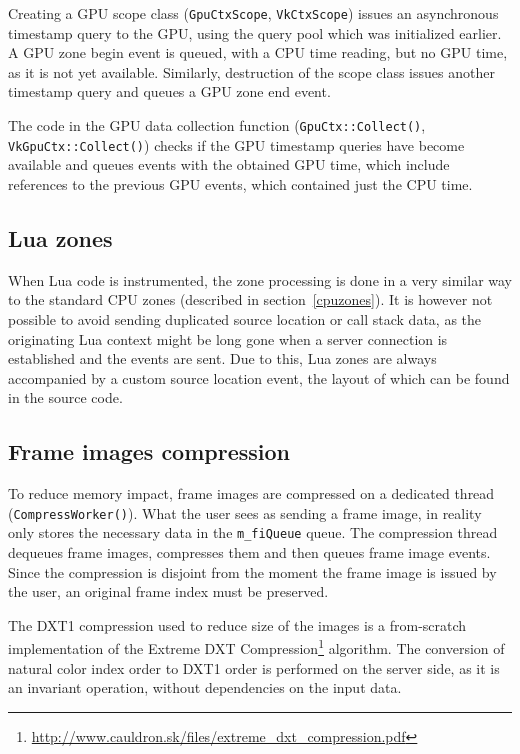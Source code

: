 \documentclass[hidelinks,titlepage,a4paper]{article}
\begin{document}
Creating a GPU scope class (\texttt{GpuCtxScope}, \texttt{VkCtxScope}) issues an asynchronous timestamp query to the GPU, using the query pool which was initialized earlier. A GPU zone begin event is queued, with a CPU time reading, but no GPU time, as it is not yet available. Similarly, destruction of the scope class issues another timestamp query and queues a GPU zone end event.

The code in the GPU data collection function (\texttt{GpuCtx::Collect()}, \texttt{VkGpuCtx::Collect()}) checks if the GPU timestamp queries have become available and queues events with the obtained GPU time, which include references to the previous GPU events, which contained just the CPU time.

\subsection{Lua zones}

When Lua code is instrumented, the zone processing is done in a very similar way to the standard CPU zones (described in section~\ref{cpuzones}). It is however not possible to avoid sending duplicated source location or call stack data, as the originating Lua context might be long gone when a server connection is established and the events are sent. Due to this, Lua zones are always accompanied by a custom source location event, the layout of which can be found in the source code.

\subsection{Frame images compression}
\label{fithread}

To reduce memory impact, frame images are compressed on a dedicated thread (\texttt{CompressWorker()}). What the user sees as sending a frame image, in reality only stores the necessary data in the \texttt{m\_fiQueue} queue. The compression thread dequeues frame images, compresses them and then queues frame image events. Since the compression is disjoint from the moment the frame image is issued by the user, an original frame index must be preserved.

The DXT1 compression used to reduce size of the images is a from-scratch implementation of the Extreme DXT Compression\footnote{\url{http://www.cauldron.sk/files/extreme_dxt_compression.pdf}} algorithm. The conversion of natural color index order to DXT1 order is performed on the server side, as it is an invariant operation, without dependencies on the input data.
\end{document}
